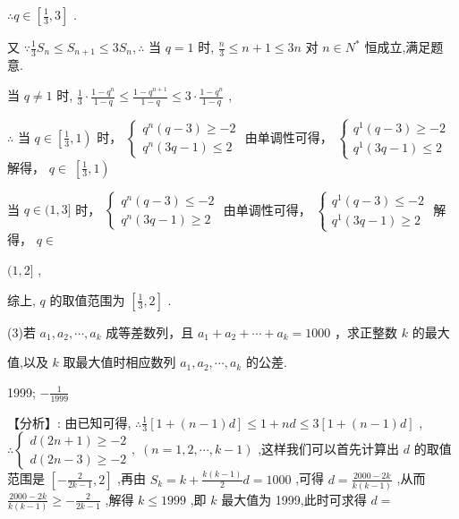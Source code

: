 \documentclass[10pt]{article}
\newcommand*\circled[1]{\tikz[baseline=(char.base)]{\node[shape=circle,draw,inner sep=1.5pt] (char) {\small #1};}}
\begin{document}
\(\therefore q \in  \left\lbrack  {\frac{1}{3},3}\right\rbrack\) .

又 \(\because \frac{1}{3}{S}_{n} \leq  {S}_{n + 1} \leq  3{S}_{n},\therefore\) 当 \(q = 1\) 时, \(\frac{n}{3} \leq  n + 1 \leq  {3n}\) 对 \(n \in  {N}^{ * }\) 恒成立,满足题意.

当 \(q \neq  1\) 时, \(\frac{1}{3} \cdot  \frac{1 - {q}^{n}}{1 - q} \leq  \frac{1 - {q}^{n + 1}}{1 - q} \leq  3 \cdot  \frac{1 - {q}^{n}}{1 - q}\) ,

\(\therefore\)  \circled{1}  当 \(q \in  \left\lbrack  {\frac{1}{3},1}\right)\) 时， \(\left\{  \begin{array}{l} {q}^{n}\left( {q - 3}\right)  \geq   - 2 \\  {q}^{n}\left( {{3q} - 1}\right)  \leq  2 \end{array}\right.\) 由单调性可得， \(\left\{  \begin{array}{l} {q}^{1}\left( {q - 3}\right)  \geq   - 2 \\  {q}^{1}\left( {{3q} - 1}\right)  \leq  2 \end{array}\right.\) 解得， \(q \in \; \left\lbrack  {\frac{1}{3},1}\right)\)

 \circled{2}  当 \(q \in  (1,3\rbrack\) 时， \(\left\{  \begin{array}{l} {q}^{n}\left( {q - 3}\right)  \leq   - 2 \\  {q}^{n}\left( {{3q} - 1}\right)  \geq  2 \end{array}\right.\) 由单调性可得， \(\left\{  \begin{array}{l} {q}^{1}\left( {q - 3}\right)  \leq   - 2 \\  {q}^{1}\left( {{3q} - 1}\right)  \geq  2 \end{array}\right.\) 解得， \(q \in\)

\((1,2\rbrack\) ,

综上, \(q\) 的取值范围为 \(\left\lbrack  {\frac{1}{3},2}\right\rbrack\) .

(3)若 \({a}_{1},{a}_{2},\cdots ,{a}_{k}\) 成等差数列，且 \({a}_{1} + {a}_{2} + \cdots  + {a}_{k} = {1000}\) ，求正整数 \(k\) 的最大

值,以及 \(k\) 取最大值时相应数列 \({a}_{1},{a}_{2},\cdots ,{a}_{k}\) 的公差.

1999; \(- \frac{1}{1999}\)

【分析】: 由已知可得, \(\therefore \frac{1}{3}\left\lbrack  {1 + \left( {n - 1}\right) d}\right\rbrack   \leq  1 + {nd} \leq  3\left\lbrack  {1 + \left( {n - 1}\right) d}\right\rbrack\) , \(\therefore \left\{  {\begin{array}{l} d\left( {{2n} + 1}\right)  \geq   - 2 \\  d\left( {{2n} - 3}\right)  \geq   - 2 \end{array},\;\left( {n = 1,2,\cdots ,k - 1}\right) }\right.\) ,这样我们可以首先计算出 \(d\) 的取值范围是 \(\left\lbrack  {-\frac{2}{{2k} - 1},2}\right\rbrack\) ,再由 \({S}_{k} = k + \frac{k\left( {k - 1}\right) }{2}d = {1000}\) ,可得 \(d = \frac{{2000} - {2k}}{k\left( {k - 1}\right) }\) ,从而 \(\frac{{2000} - {2k}}{k\left( {k - 1}\right) } \geq   - \frac{2}{{2k} - 1}\) ,解得 \(k \leq  {1999}\) ,即 \(k\) 最大值为 1999,此时可求得 \(d =\)
\end{document}
